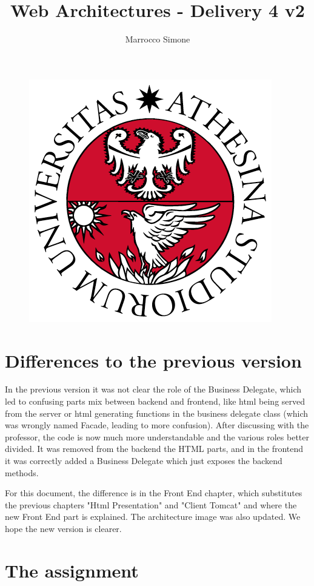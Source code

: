 \documentclass[12pt, a4paper]{article}
\title{Web Architectures - Delivery 4 v2}
\author{Marrocco Simone}
\begin{document}
  \maketitle
  \begin{figure}[H]
    \centering
    \includegraphics[scale=0.35]{unitn.png}
  \end{figure}
  \tableofcontents

  \section{Differences to the previous version}
  In the previous version it was not clear the role of the Business Delegate, which led to confusing parts mix between backend and frontend, like html being served from the server or html generating functions in the business delegate class (which was wrongly named Facade, leading to more confusion). After discussing with the professor, the code is now much more understandable and the various roles better divided. It was removed from the backend the HTML parts, and in the frontend it was correctly added a Business Delegate which just exposes the backend methods. 

  For this document, the difference is in the Front End chapter, which substitutes the previous chapters "Html Presentation" and "Client Tomcat" and where the new Front End part is explained. The architecture image was also updated. We hope the new version is clearer. 

  \pagebreak
  \section{The assignment}
\end{document}
